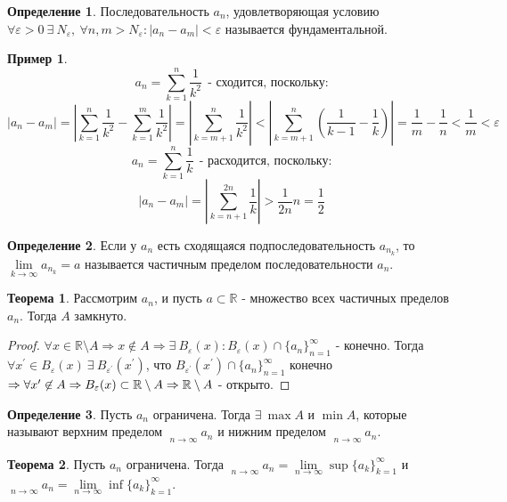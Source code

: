 \documentclass[a4paper, 12pt]{article}
\newcommand{\R}{\mathbb{R}}
\renewcommand{\epsilon}{\varepsilon}
\newcommand{\lims}{\lim\limits_{n\to \infty}}
\DeclareMathOperator*\lowlim{\underline{lim}}
\DeclareMathOperator*\uplim{\overline{lim}}
\theoremstyle{definition}
\newtheorem*{definition}{Определение}
\newtheorem*{theorem}{Теорема}
\newtheorem*{example}{Пример}
\begin{document}
        \begin{definition}
            Последовательность $a_n$, удовлетворяющая условию\\ $\forall \epsilon>0\ \exists\ N_{\epsilon},\ \forall n,m>N_{\epsilon}: |a_n-a_m|<\epsilon$ называется фундаментальной.
        \end{definition} 
        \begin{example}
                \[a_n=\sum\limits_{k=1}^n\frac{1}{k^2}\ \ \text{- сходится, поскольку:}\] 
                \[|a_n-a_m|=|\sum\limits_{k=1}^n\frac{1}{k^2}-\sum\limits_{k=1}^m\frac{1}{k^2}|=|\sum\limits_{k=m+1}^n\frac{1}{k^2}|<|\sum\limits_{k=m+1}^n (\frac{1}{k-1}-\frac{1}{k})|=\frac{1}{m}-\frac{1}{n}<\frac{1}{m}<\epsilon\]
                \[a_n=\sum\limits_{k=1}^n\frac{1}{k}\ \ \text{- расходится, поскольку:}\]
                \[|a_n-a_m|=|\sum\limits_{k=n+1}^{2n}\frac{1}{k}|>\frac{1}{2n}n=\frac{1}{2}\]
        \end{example}
        \begin{definition}
            Если у $a_n$ есть сходящаяся подпоследовательность $a_{n_k}$, то\\ $\lim\limits_{k\to \infty}a_{n_k}=a$ называется частичным пределом последовательности $a_n$.
        \end{definition} 
        \begin{theorem}
            Рассмотрим $a_n$, и пусть $a\subset \R$ - множество всех частичных пределов $a_n$. Тогда $A$ замкнуто.
        \end{theorem} 
        \begin{proof}
            $\forall x\in \R\setminus A \Rightarrow x\not\in A \Rightarrow \exists\ B_{\epsilon}(x): B_{\epsilon}(x)\cap\{a_n\}_{n=1}^{\infty}$ - конечно. Тогда $\forall x^{\prime}\in B_{\epsilon}(x)\ \exists\ B_{\epsilon^{\prime}}(x^{\prime})$, что $B_{\epsilon^{\prime}}(x^{\prime})\cap\{a_n\}_{n=1}^{\infty}$ конечно $\Rightarrow \forall x^{\prime} \not\in A\\ \Rightarrow B_{\epsilon}(x)\subset \R\setminus A\Rightarrow \R\setminus A$ - открыто.
        \end{proof} 
        \begin{definition}
            Пусть $a_n$ ограничена. Тогда $\exists\ \max A$ и $\min A$, которые называют верхним пределом $\uplim\limits_{n\to \infty}a_n$ и нижним пределом $\lowlim\limits_{n\to \infty}a_n$. 
        \end{definition} 
        \begin{theorem}
            Пусть  $a_n$ ограничена. Тогда $\uplim\limits_{n\to \infty}a_n=\lims \sup\{a_k\}_{k=1}^{\infty}$ и\\
            $\lowlim\limits_{n\to \infty}a_n=\lims \inf\{a_k\}_{k=1}^{\infty}$.
        \end{theorem} 
\end{document}
